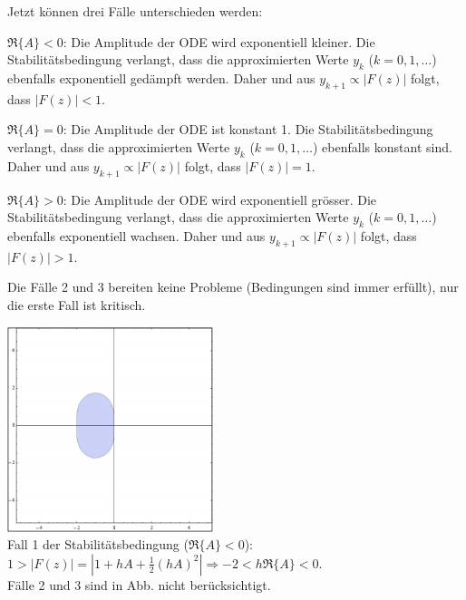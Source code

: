       \begin{minipage}{10cm}
        Jetzt können drei Fälle unterschieden werden:
        \begin{liste}
          \item $\Re\{A\} < 0$: Die Amplitude der ODE wird exponentiell kleiner. Die Stabilitätsbedingung 
            verlangt, dass die approximierten Werte $y_k$ ($k=0,1,\ldots$) ebenfalls exponentiell 
            gedämpft werden. Daher und aus $y_{k+1} \propto | F(z) |$ folgt, dass $|F(z)| < 1$.
          \item $\Re\{A\} = 0$: Die Amplitude der ODE ist konstant 1. Die Stabilitätsbedingung 
            verlangt, dass die approximierten Werte $y_k$ ($k=0,1,\ldots$) ebenfalls konstant sind. 
            Daher und aus $y_{k+1} \propto | F(z) |$ folgt, dass $|F(z)| = 1$.
          \item $\Re\{A\} > 0$: Die Amplitude der ODE wird exponentiell grösser. Die Stabilitätsbedingung 
            verlangt, dass die approximierten Werte $y_k$ ($k=0,1,\ldots$) ebenfalls exponentiell 
            wachsen. Daher und aus $y_{k+1} \propto | F(z) |$ folgt, dass $|F(z)| > 1$.
        \end{liste}
        
        Die Fälle 2 und 3 bereiten keine Probleme (Bedingungen sind immer erfüllt), nur die erste Fall ist kritisch.
      \end{minipage}
      \hspace{1cm}
      \begin{minipage}{8cm}
        \includegraphics[width=6cm]{./bilder/ode_stability_heun.png}\\
        Fall 1 der Stabilitätsbedingung ($\Re\{A\} < 0$): \\
        $1 > |F(z)| = |1 + hA + \frac12 (hA)^2| \Rightarrow -2 < h \Re\{A\} < 0$.\\
        Fälle 2 und 3 sind in Abb. nicht berücksichtigt.
      \end{minipage}
      
